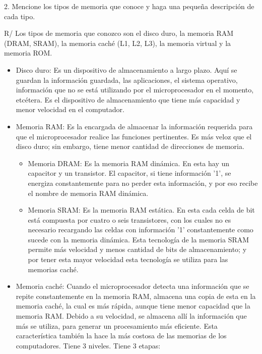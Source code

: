 \documentclass{article}
\begin{document}
\vspace{1.0cm}
2. Mencione los tipos de memoria que conoce y haga una pequeña descripción de cada tipo.

\vspace{0.3cm}
R/ Los tipos de memoria que conozco son el disco duro, la memoria RAM (DRAM, SRAM), la memoria caché (L1, L2, L3), la memoria virtual y la memoria ROM.

\begin{itemize}

    \item Disco duro:
    Es un dispositivo de almacenamiento a largo plazo. Aquí se guardan la información guardada, las aplicaciones, el sistema operativo, información que no se está utilizando por el microprocesador en el momento, etcétera. Es el dispositivo de almacenamiento que tiene más capacidad y menor velocidad en el computador.
    
    \item Memoria RAM:
    Es la encargada de almacenar la información requerida para que el microprocesador realice las funciones pertinentes. Es más veloz que el disco duro; sin embargo, tiene menor cantidad de direcciones de memoria.
    
    \begin{itemize}
    
        \item Memoria DRAM:
        Es la memoria RAM dinámica. En esta hay un capacitor y un transistor. El capacitor, si tiene información '1', se energiza constantemente para no perder esta información, y por eso recibe el nombre de memoria RAM dinámica.
        
        \item Memoria SRAM:
        Es la memoria RAM estática. En esta cada celda de bit está compuesta por cuatro o seis transistores, con los cuales no es necesario recargando las celdas con información '1' constantemente como sucede con la memoria dinámica. Esta tecnología de la memoria SRAM permite más velocidad y menos cantidad de bits de almacenamiento; y por tener esta mayor velocidad esta tecnología se utiliza para las memorias caché.
    
    \end{itemize}


    \item Memoria caché:
    Cuando el microprocesador detecta una información que se repite constantemente en la memoria RAM, almacena una copia de esta en la memoria caché, la cual es más rápida, aunque tiene menor capacidad que la memoria RAM. Debido a su velocidad, se almacena allí la información que más se utiliza, para generar un procesamiento más eficiente. Esta característica también la hace la más costosa de las memorias de los computadores. Tiene 3 niveles.
    Tiene 3 etapas:
    

\end{itemize}
\end{document}
